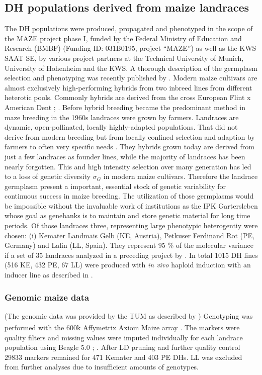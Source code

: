 \subsection{DH populations derived from maize landraces}
The DH populations were produced, propagated and phenotyped in the scope of the MAZE project phase I, funded
by the Federal Ministry of Education and Research (BMBF) (Funding ID: 031B0195, project “MAZE”) as well as the
KWS SAAT SE, by various project partners at the Technical University of Munich, University of Hohenheim and
the KWS. A thorough description of the germplasm selection and phenotyping was recently published by
\cite{holker2019european}. \newline Modern maize cultivars are almost exclusively high-performing hybrids from
two inbreed lines from different heterotic pools. Commonly hybrids are derived from the cross European Flint x
American Dent \cite{dos2004priori}; \cite{brauner2019testcross}. Before hybrid breeding became the predominant
method in maze breeding in the 1960s landraces were grown by farmers. Landraces are dynamic, open-pollinated,
locally highly-adapted populations. That did not derive from modern breeding but from locally confined
selection and adaption by farmers to often very specific needs \cite{arteaga2016genomic}. They hybrids grown
today are derived from just a few landraces as founder lines, while the majority of landraces has been nearly
forgotten. This and high intensity selection over many generation has led to a loss of genetic diversity
$\sigma_G$ in modern maize cultivars. Therefore the landrace germplasm present a important, essential stock of
genetic variability for continuous success in maize breeding. The utilization of those germplasms would be
impossible without the invaluable work of institutions as the IPK Gartersleben whose goal as genebanks is to
maintain and store genetic material for long time periods. Of those landraces three, representing large
phenotypic heterogentiy were chosen: (i) Kemater Landmais Gelb (KE, Austria), Petkuser Ferdinand Rot (PE,
Germany) and Lalin (LL, Spain). They represent 95 \% of the molecular variance if a set of
35 landraces analyzed in a preceding project by \cite{mayer2017there}.\newline
In total 1015 DH lines (516 KE, 432 PE, 67 LL) were produced with \textit{in vivo} haploid induction with an inducer line as described in \cite{roeber2005vivo}.


\subsubsection{Genomic maize data}
(The genomic data was provided by the TUM as described by \cite{holker2019european}) \newline Genotyping was
performed with the 600k Affymetrix\textsuperscript{\textregistered} Axiom\textsuperscript{\textregistered}
Maize array \cite{unterseer2014powerful}. The markers were quality filters and missing values were imputed
individually for each landrace population using Beagle 5.0 \cite{browning2007rapid};
\cite{browning2018one}. After LD pruning and further quality control 29833 markers remained for 471 Kemater
and 403 PE DHs. LL was excluded from further analyses due to insufficient amounts of genotypes.

